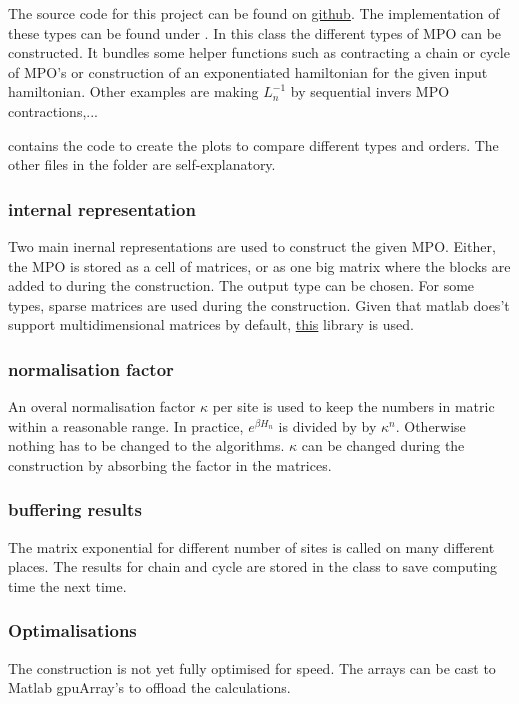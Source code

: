 The source code for this project can be found on \href{https://github.com/DavidDevoogdt/Thesis_Tensor_Networks}{github}. The implementation of these types can be found under . In this class the different types of MPO can be constructed. It bundles some helper functions such as contracting a chain or cycle of MPO's or construction of an exponentiated hamiltonian for the given input hamiltonian. Other examples are making $L_n^{-1}$ by sequential invers MPO contractions,...

  contains the code to create the plots to compare different types and orders. The other files in the folder are self-explanatory.

\subsubsection{internal representation}

Two main inernal representations are used to construct the given MPO. Either, the MPO is stored as a cell of matrices, or as one big matrix where the blocks are added to during the construction. The output type can be chosen. For some types, sparse matrices are used during the construction. Given that matlab does't support multidimensional matrices by default, \href{https://nl.mathworks.com/matlabcentral/fileexchange/29832-n-dimensional-sparse-arrays}{this} library is used.

\subsubsection{normalisation factor}

An overal normalisation factor $\kappa$ per site is used to keep the numbers in matric within a reasonable range. In practice, $e^{\beta H_n}$ is divided by by $\kappa^n$. Otherwise nothing has to be changed to the algorithms. $\kappa$ can be changed during the construction by absorbing the factor in the matrices.

\subsubsection{buffering results}

The matrix exponential for different number of sites is called on many different places. The results for chain and cycle are stored in the class to save computing time the next time.

\subsubsection{Optimalisations}
The construction is not yet fully optimised for speed. The arrays can be cast to Matlab gpuArray's to offload the calculations.